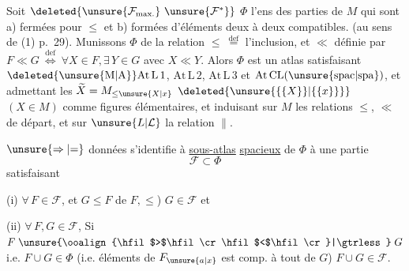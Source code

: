 
Soit $\deleted{\unsure{\mathcal F_{\mathrm{max.}}}\ \unsure{\mathcal F^{*}}}$ $\Phi$ l'ens des parties de $M$ qui sont a) fermées pour $\leq$ et b) formées d'éléments deux à deux compatibles. (au sens de (1) p.~29). Munissons $\Phi$ de la relation $\leq\ \overset{\mathrm{def}}{=}$ l'inclusion, et $\ll$ définie par $F\ll G\ \overset{\mathrm{def}}{\Longleftrightarrow}\ \forall X\in F,\exists\,Y\in G$ avec $X\ll Y$. Alors $\Phi$ est un atlas  satisfaisant $\mathrm{\deleted{\unsure{M|A}}At\,L\,1}$, $\mathrm{At\,L\,2}$, $\mathrm{At\,L\,3}$ et $\mathrm{At\,CL(\unsure{\mathrm{spac}|\mathrm{spa}})}$, et admettant les $\widetilde X=M_{\leq\unsure{X|x}}$ $\deleted{\unsure{\{\{X\}\}|\{\{x\}\}}}$ $(X\in M)$ comme  figures élémentaires,  et  induisant sur $M$ les relations $\leq$, $\ll$ de départ, et sur $\unsure{L|\mathcal L}$  la relation $\parallel$.

  $\unsure{\Rightarrow|\mathord{=}}$ données s'identifie à  \uline{sous-atlas} \uline{spacieux} de $\Phi$   à une partie
\[
 \mathcal F\subset\Phi
\]
satisfaisant

(i) $\forall\,F\in\mathcal F$, et $G\leq F$   de $F,\leq$)  $G\in\mathcal F$ et

(ii) $\forall\,F,G\in\mathcal F$, Si $F\mathrel{\unsure{\ooalign{\hfil$>$\hfil\cr\hfil$<$\hfil\cr}|\gtrless}}G$ i.e. $F\cup G\in\Phi$ (i.e.  éléments de $F_{\unsure{a|x}}$ est comp. à tout  de $G$) $F\cup G\in\mathcal F$.
